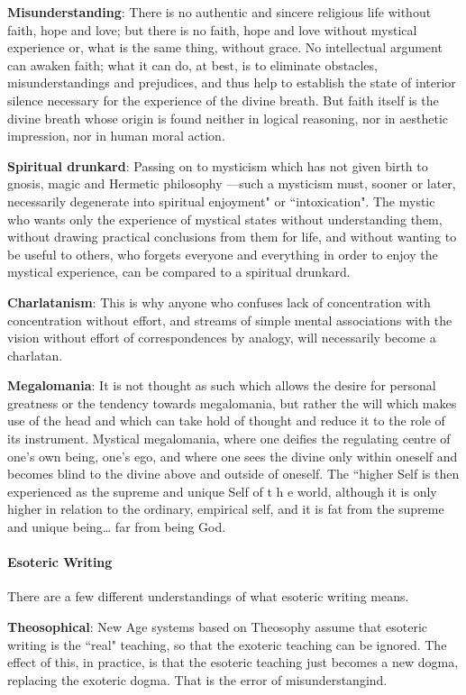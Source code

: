 \textbf{Misunderstanding}: There is no authentic and sincere religious life without faith, hope and love; but there is no faith, hope and love without mystical experience or, what is the same thing, without grace. No intellectual argument can awaken faith; what it can do, at best, is to eliminate obstacles, misunderstandings and prejudices, and thus help to establish the state of interior silence necessary for the experience of the divine breath. But faith itself is the divine breath whose origin is found neither in logical reasoning, nor in aesthetic impression, nor in human moral action.

\textbf{Spiritual drunkard}: Passing on to mysticism which has not given birth to gnosis, magic and Hermetic philosophy —such a mysticism must, sooner or later, necessarily degenerate into spiritual enjoyment" or ``intoxication". The mystic who wants only the experience of mystical states without understanding them, without drawing practical conclusions from them for life, and without wanting to be useful to others, who forgets everyone and everything in order to enjoy the mystical experience, can be compared to a spiritual drunkard.

\textbf{Charlatanism}: This is why anyone who confuses lack of concentration with concentration without effort, and streams of simple mental associations with the vision without effort of correspondences by analogy, will necessarily become a charlatan.

\textbf{Megalomania}: It is not thought as such which allows the desire for personal greatness or the tendency towards megalomania, but rather the will which makes use of the head and which can take hold of thought and reduce it to the role of its instrument. Mystical megalomania, where one deifies the regulating centre of one's own being, one's ego, and where one sees the divine only within oneself and becomes blind to the divine above and outside of oneself. The ``higher Self is then experienced as the supreme and unique Self of t h e world, although it is only higher in relation to the ordinary, empirical self, and it is fat from the supreme and unique being… far from being God.

\paragraph{Esoteric Writing}
There are a few different understandings of what esoteric writing means.

\textbf{Theosophical}: New Age systems based on Theosophy assume that esoteric writing is the ``real" teaching, so that the exoteric teaching can be ignored. The effect of this, in practice, is that the esoteric teaching just becomes a new dogma, replacing the exoteric dogma. That is the error of misunderstangind.

